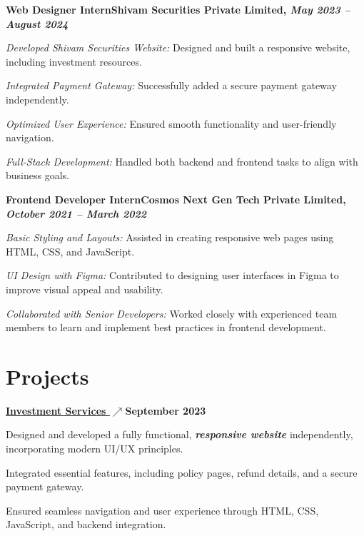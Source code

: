 \documentclass[letterpaper,10pt]{article}
\newcommand{\heading}[2]{
  \hspace{10pt}#1\hfill#2\\
}
\newcommand{\headingBf}[2]{
  \heading{\textbf{#1}}{\textbf{#2}}
}
\newenvironment{resume_list}{
  \vspace{-7pt}
  \begin{itemize}[itemsep=-2px, parsep=1pt, leftmargin=30pt]
}{
  \end{itemize}
}
\begin{document}
  \headingBf{Web Designer Intern}{Shivam Securities Private Limited, \textit{May 2023 -- August 2024}}  \vspace{3pt}
  \begin{resume_list}
    \item \textit{Developed Shivam Securities Website:} Designed and built a responsive website, including investment resources.
    \item \textit{Integrated Payment Gateway:} Successfully added a secure payment gateway independently.
    \item \textit{Optimized User Experience:} Ensured smooth functionality and user-friendly navigation.
    \item \textit{Full-Stack Development:} Handled both backend and frontend tasks to align with business goals.
  \end{resume_list}

  \headingBf{Frontend Developer Intern}{Cosmos Next Gen Tech Private Limited, \textit{October 2021 -- March 2022}}  \vspace{3pt}
  \begin{resume_list}
    \item \textit{Basic Styling and Layouts:} Assisted in creating responsive web pages using HTML, CSS, and JavaScript.
    \item \textit{UI Design with Figma:} Contributed to designing user interfaces in Figma to improve visual appeal and usability.
    \item \textit{Collaborated with Senior Developers:} Worked closely with experienced team members to learn and implement best practices in frontend development.
  \end{resume_list}


  \section{Projects}

    \headingBf {\underline{\href{https://surajkr97.github.io/ShivamSecurities/}{Investment Services \(\nearrow\)}}}{September 2023}  \vspace{4pt}
    \begin{resume_list}
    \item Designed and developed a fully functional, \textit{\textbf{responsive website}} independently, incorporating modern UI/UX principles.
    \item Integrated essential features, including policy pages, refund details, and a secure payment gateway.
    \item Ensured seamless navigation and user experience through HTML, CSS, JavaScript, and backend integration.
    \end{resume_list} 
    
\end{document}
